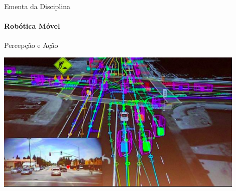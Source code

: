 \documentclass[aspectratio=169]{beamer}
\begin{document}
\begin{frame}[t]{Ementa da Disciplina}
	\framesubtitle{Robótica Móvel}
	\begin{block}{Percepção e Ação}
	\end{block}
	\begin{center}
		\includegraphics[width=0.9\textwidth]{./images/autonomous-car_2.png}
	\end{center}
\end{frame}
\end{document}
